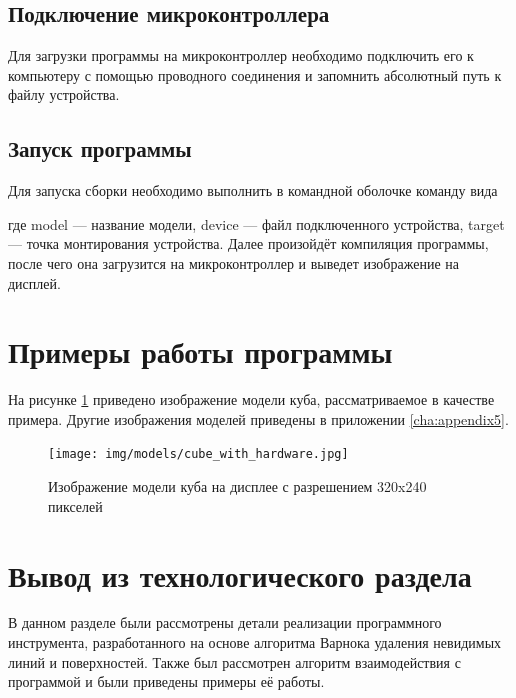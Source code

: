 \subsection{Подключение микроконтроллера}
Для загрузки программы на микроконтроллер необходимо подключить его к компьютеру с помощью проводного соединения и запомнить 
абсолютный путь к файлу устройства.

\subsection{Запуск программы}
Для запуска сборки необходимо выполнить в командной оболочке команду вида 

где model --- название модели, device --- файл подключенного устройства, target --- точка монтирования устройства. 
Далее произойдёт компиляция программы, после чего она загрузится на микроконтроллер и выведет изображение на дисплей. 



\section{Примеры работы программы}
На рисунке \ref{fig:cube} приведено изображение модели куба, рассматриваемое в качестве примера. Другие изображения моделей приведены в 
приложении \ref{cha:appendix5}.

\newpage
\begin{figure}[h]
	\centering
	\texttt{[image: img/models/cube\_with\_hardware.jpg]}
	\caption{Изображение модели куба на дисплее с разрешением 320x240 пикселей}
	\label{fig:cube}
\end{figure} 





\section{Вывод из технологического раздела}
В данном разделе были рассмотрены детали реализации программного инструмента, разработанного на основе алгоритма Варнока удаления 
невидимых линий и поверхностей. Также был рассмотрен алгоритм взаимодействия с программой и были приведены примеры её работы.
